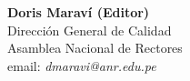 \begin{center}
\textbf{Doris Maraví (Editor)} \\
Dirección General de Calidad \\
Asamblea Nacional de Rectores \\
email: \textit{dmaravi@anr.edu.pe} \\
\end{center}

